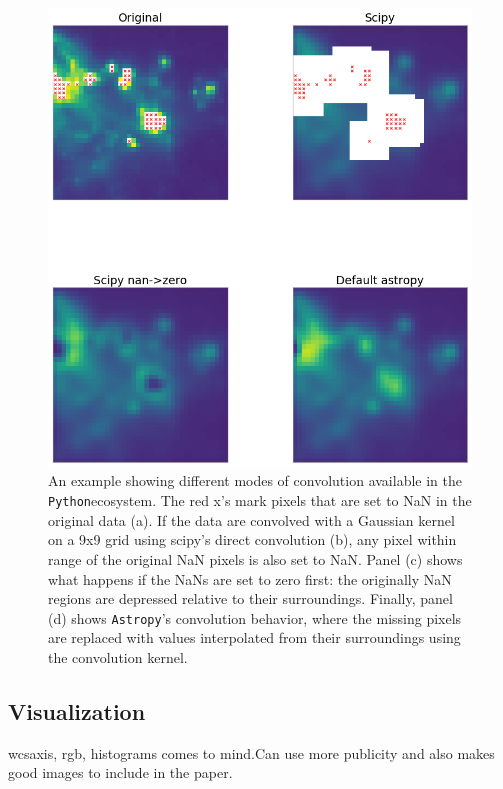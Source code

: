 \documentclass[modern]{aastex61}
\newcommand{\package}[1]{\texttt{#1}}
\newcommand{\python}{\package{Python}}
\newcommand{\astropypkg}{\package{Astropy}}
\begin{document}
\begin{figure}
\includegraphics[width=\textwidth]{convolution_example.png}
An example showing different modes of convolution available in the \python ecosystem.  The red x's mark pixels that are set to NaN in the original data (a).  If the data are convolved with a Gaussian kernel on a 9x9 grid using scipy's direct convolution (b), any pixel within range of the original NaN pixels is also set to NaN.  Panel (c) shows what happens if the NaNs are set to zero first: the originally NaN regions are depressed relative to their surroundings.  Finally, panel (d) shows \astropypkg's convolution behavior, where the missing pixels are replaced with values interpolated from their surroundings using the convolution kernel.
\end{figure}


\subsection{Visualization}

wcsaxis, rgb, histograms comes to mind.Can use more publicity and also makes good images to include in the paper.
\end{document}
